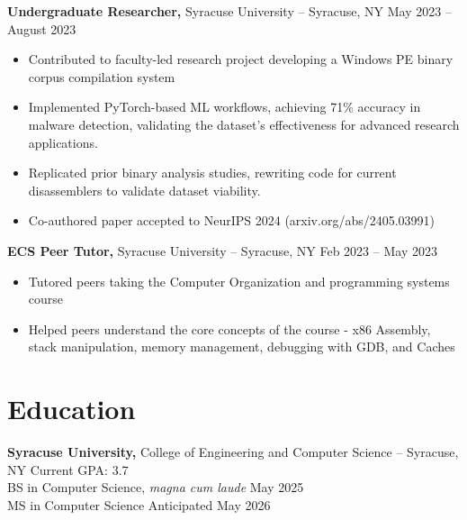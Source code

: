 \documentclass[11pt]{article}       %
\begin{document}
	\vspace{-6pt}
	\textbf{Undergraduate Researcher,} {Syracuse University} -- Syracuse, NY \hfill May 2023 -- August 2023 \\
	\vspace{-9pt}
	\begin{itemize}
		\item Contributed to faculty-led research project developing a Windows PE binary corpus compilation system
		\item Implemented PyTorch-based ML workflows, achieving 71\% accuracy in malware detection, validating the dataset's effectiveness for advanced research applications.
		\item Replicated prior binary analysis studies, rewriting code for current disassemblers to validate dataset viability.
		\item Co-authored paper accepted to NeurIPS 2024 (arxiv.org/abs/2405.03991)
	\end{itemize}
	\vspace{-6pt}
	\textbf{ECS Peer Tutor,} {Syracuse University} -- Syracuse, NY \hfill Feb 2023 -- May 2023 \\
	\vspace{-9pt}
	\begin{itemize}
		\item Tutored peers taking the Computer Organization and programming systems course
		\item Helped peers understand the core concepts of the course - x86 Assembly, stack manipulation, memory management, debugging with GDB, and Caches
	\end{itemize}
	
	\vspace{-25pt}
	
	
	\section*{Education}
	\textbf{Syracuse University, } {College of Engineering and Computer Science} -- Syracuse, NY \hfill Current GPA: 3.7 \\
	\hspace{2em}BS in Computer Science, \textit{magna cum laude} \hfill May 2025 \\
	\hspace{2em}MS in Computer Science \hfill Anticipated May 2026 \\
	
	\vspace{-20pt}
\end{document}
